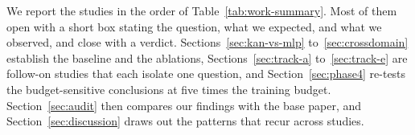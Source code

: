 We report the studies in the order of Table~\ref{tab:work-summary}. Most
of them open with a short box stating the question, what we expected, and
what we observed, and close with a verdict. Sections~\ref{sec:kan-vs-mlp}
to~\ref{sec:crossdomain} establish the baseline and the ablations,
Sections~\ref{sec:track-a} to~\ref{sec:track-e} are follow-on studies that
each isolate one question, and Section~\ref{sec:phase4} re-tests the
budget-sensitive conclusions at five times the training budget.
Section~\ref{sec:audit} then compares our findings with the base paper, and
Section~\ref{sec:discussion} draws out the patterns that recur across
studies.















